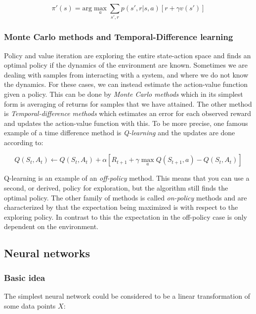\begin{equation}
    \pi'(s) = \text{arg}\max_a \sum_{s', r} p(s', r|s, a) \left[r + \gamma v(s')\right]
\end{equation}

\subsubsection{Monte Carlo methods and Temporal-Difference learning}

Policy and value iteration are exploring the entire state-action space and
finds an optimal policy if the dynamics of the environment are known. Sometimes
we are dealing with samples from interacting with a system, and where we do not
know the dynamics. For these cases, we can instead estimate the action-value
function given a policy. This can be done by \textit{Monte Carlo methods} which
in its simplest form is averaging of returns for samples that we have attained.
The other method is \textit{Temporal-difference methods} which estimates an error
for each observed reward and updates the action-value function with this. To be
more precise, one famous example of a time difference method is
\textit{Q-learning} and the updates are done according to:

\begin{equation}
    Q(S_t, A_t) \leftarrow Q(S_t, A_t) + \alpha \left[ R_{t+1} + \gamma \max_a Q(S_{t+1}, a) - Q(S_t, A_t) \right]
\end{equation}

Q-learning is an example of an \textit{off-policy} method. This means that you
can use a second, or derived, policy for exploration, but the algorithm still
finds the optimal policy. The other family of methods is called
\textit{on-policy} methods and are characterized by that the expectation being
maximized is with respect to the exploring policy. In contrast to this the
expectation in the off-policy case is only dependent on the environment.

\subsection{Neural networks}

\subsubsection{Basic idea}

The simplest neural network could be considered to be a linear transformation
of some data points $X$:

